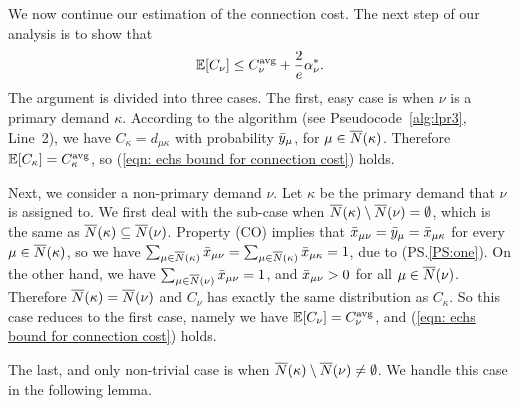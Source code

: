 \documentclass[oneside,final]{ucr}
\begin{document}
We now continue our estimation of the connection cost.  The next step
of our analysis is to show that 
%
\begin{equation}
	\mathbb{E}[C_\nu]\le C^{{\mbox{\scriptsize\rm avg}}}_{\nu} + \frac{2}{e}\alpha^\ast_\nu.
	\label{eqn: echs bound for connection cost}
\end{equation}
%
The argument is divided into three cases. The first, easy case is when
$\nu$ is a primary demand $\kappa$. According to the algorithm
(see Pseudocode~\ref{alg:lpr3}, Line~2), we have $C_\kappa = d_{\mu\kappa}$ with probability ${\bar y}_{\mu}$, 
for $\mu\in {\overline{N}}(\kappa)$. Therefore $\mathbb{E}[C_\kappa] = C^{{\mbox{\scriptsize\rm avg}}}_{\kappa}$, so
(\ref{eqn: echs bound for connection cost}) holds.

Next, we consider a non-primary demand $\nu$. Let $\kappa$
be the primary demand that $\nu$ is assigned to. We first
deal with the sub-case when ${\overline{N}}(\kappa)\setminus
{\overline{N}}(\nu) = \emptyset$, which is the same as
${\overline{N}}(\kappa) \subseteq {\overline{N}}(\nu)$. Property (CO)
implies that ${\bar x}_{\mu\nu} = {\bar y}_{\mu} =
{\bar x}_{\mu\kappa}$ for every $\mu \in {\overline{N}}(\kappa)$, so we
have $\sum_{\mu\in{\overline{N}}(\kappa)} {\bar x}_{\mu\nu} =
\sum_{\mu\in{\overline{N}}(\kappa)} {\bar x}_{\mu\kappa} = 1$, due to
(PS.\ref{PS:one}). On the other hand, we have
$\sum_{\mu\in{\overline{N}}(\nu)} {\bar x}_{\mu\nu} = 1$, and
${\bar x}_{\mu\nu} > 0$ for all $\mu\in {\overline{N}}(\nu)$. Therefore
${\overline{N}}(\kappa) = {\overline{N}}(\nu)$ and $C_\nu$ has exactly the
same distribution as $C_\kappa$.  So this case reduces to
the first case, namely we have $\mathbb{E}[C_{\nu}] =
C^{{\mbox{\scriptsize\rm avg}}}_{\nu}$, and (\ref{eqn: echs bound for connection
  cost}) holds.

The last, and only non-trivial case is when ${\overline{N}}(\kappa)\setminus
{\overline{N}}(\nu)\neq\emptyset$. We handle this case in the following lemma.

\end{document}
